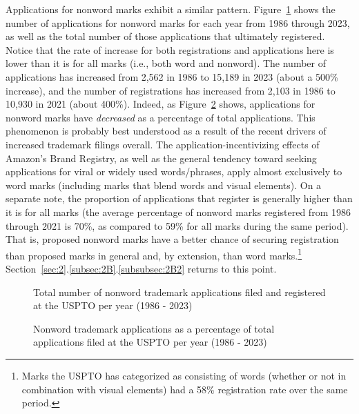 \documentclass[letterpaper, 11pt, oneside]{article}
\begin{document}
Applications for nonword marks exhibit a similar pattern. Figure~\ref{fig:2} shows the number of applications for nonword marks for each year from 1986 through 2023, as well as the total number of those applications that ultimately registered. Notice that the rate of increase for both registrations and applications here is lower than it is for all marks (i.e., both word and nonword). The number of applications has increased from 2,562 in 1986 to 15,189 in 2023 (about a 500\% increase), and the number of registrations has increased from 2,103 in 1986 to 10,930 in 2021 (about 400\%). Indeed, as Figure~\ref{fig:3} shows, applications for nonword marks have \emph{decreased} as a percentage of total applications. This phenomenon is probably best understood as a result of the recent drivers of increased trademark filings overall. The application-incentivizing effects of Amazon's Brand Registry, as well as the general tendency toward seeking applications for viral or widely used words/phrases, apply almost exclusively to word marks (including marks that blend words and visual elements). On a separate note, the proportion of applications that register is generally higher than it is for all marks (the average percentage of nonword marks registered from 1986 through 2021 is 70\%, as compared to 59\% for all marks during the same period). That is, proposed nonword marks have a better chance of securing registration than proposed marks in general and, by extension, than word marks.\footnote{Marks the USPTO has categorized as consisting of words (whether or not in combination with visual elements) had a 58\% registration rate over the same period.} Section~\ref{sec:2}.\ref{subsec:2B}.\ref{subsubsec:2B2} returns to this point.

\begin{figure}[H]
\centering

\caption{\label{fig:2} Total number of nonword trademark applications filed and registered at the USPTO per year (1986 - 2023)}
\end{figure}

\begin{figure}[H]
\centering

\caption{\label{fig:3} Nonword trademark applications as a percentage of total applications filed at the USPTO per year (1986 - 2023)}
\end{figure}
\end{document}
